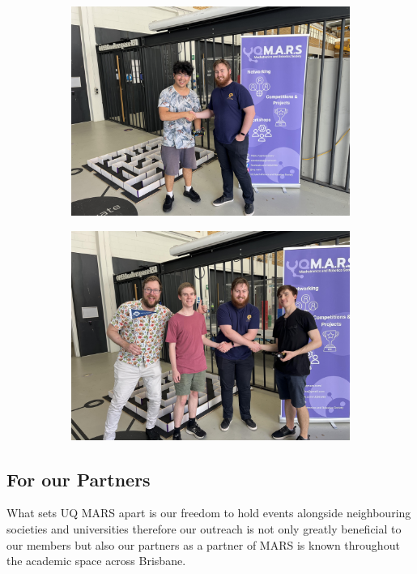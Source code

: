 \documentclass[a4paper,12pt]{report}
\begin{document}
\begin{figure}[H]
    \centering
    \begin{subfigure}{0.32\linewidth}
        \includegraphics[width=0.99\linewidth]{prospectus/2024/Photos/SecondPlace.jpg}
    \end{subfigure}
    \begin{subfigure}{0.32\linewidth}
        \includegraphics[width=0.99\linewidth]{prospectus/2024/Photos/TeamSpiritz.jpg}
    \end{subfigure}
\end{figure}

\vspace{-1.5cm}

\subsection{For our Partners}
What sets UQ MARS apart is our freedom to hold events alongside neighbouring societies and universities therefore our outreach is not only greatly beneficial to our members but also our partners as a partner of MARS is known throughout the academic space across Brisbane.
\end{document}
